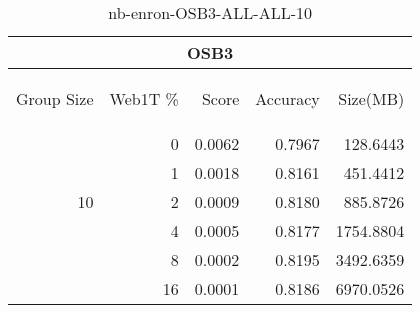 \begin{center}
\begin{table}[htbp]
\begin{tabular}{ | r | r | r | r | r |}
\hline
\multicolumn{5}{|c|}{OSB3}\\
\hline
\begin{sideways}Group Size\end{sideways} & \begin{sideways}Web1T \%\end{sideways} & \begin{sideways}Score\end{sideways} & \begin{sideways}Accuracy\end{sideways} & \begin{sideways}Size(MB)\end{sideways}\\
\hline
\multirow{5}{*}{10}
 & 0 & 0.0062 & 0.7967 & 128.6443\\ \cline{2-5}
 & 1 & 0.0018 & 0.8161 & 451.4412\\ \cline{2-5}
 & 2 & 0.0009 & 0.8180 & 885.8726\\ \cline{2-5}
 & 4 & 0.0005 & 0.8177 & 1754.8804\\ \cline{2-5}
 & 8 & 0.0002 & 0.8195 & 3492.6359\\ \cline{2-5}
 & 16 & 0.0001 & 0.8186 & 6970.0526\\ \cline{2-5}
\hline
\end{tabular}
\caption{nb-enron-OSB3-ALL-ALL-10}
\label{table:nb-enron-OSB3-ALL-ALL-10}
\end{table}
\end{center}

